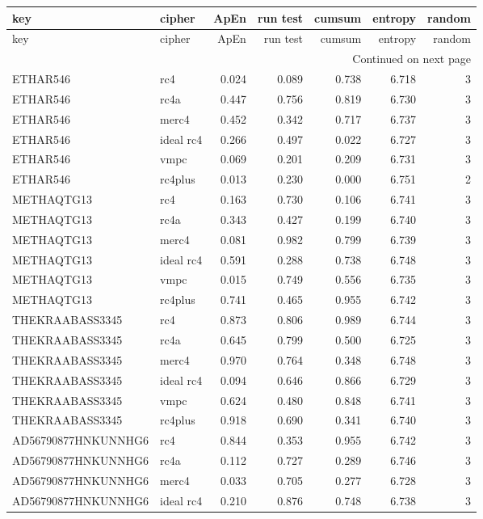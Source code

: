 \begin{longtable}{llrrrrr}
\toprule
key & cipher & ApEn & run test & cumsum & entropy & random \\
\midrule
\endfirsthead
\toprule
key & cipher & ApEn & run test & cumsum & entropy & random \\
\midrule
\endhead
\midrule
\multicolumn{7}{r}{Continued on next page} \\
\midrule
\endfoot
\bottomrule
\endlastfoot
ETHAR546 & rc4 & 0.024 & 0.089 & 0.738 & 6.718 & 3 \\
ETHAR546 & rc4a & 0.447 & 0.756 & 0.819 & 6.730 & 3 \\
ETHAR546 & merc4 & 0.452 & 0.342 & 0.717 & 6.737 & 3 \\
ETHAR546 & ideal rc4 & 0.266 & 0.497 & 0.022 & 6.727 & 3 \\
ETHAR546 & vmpc & 0.069 & 0.201 & 0.209 & 6.731 & 3 \\
ETHAR546 & rc4plus & 0.013 & 0.230 & 0.000 & 6.751 & 2 \\
METHAQTG13 & rc4 & 0.163 & 0.730 & 0.106 & 6.741 & 3 \\
METHAQTG13 & rc4a & 0.343 & 0.427 & 0.199 & 6.740 & 3 \\
METHAQTG13 & merc4 & 0.081 & 0.982 & 0.799 & 6.739 & 3 \\
METHAQTG13 & ideal rc4 & 0.591 & 0.288 & 0.738 & 6.748 & 3 \\
METHAQTG13 & vmpc & 0.015 & 0.749 & 0.556 & 6.735 & 3 \\
METHAQTG13 & rc4plus & 0.741 & 0.465 & 0.955 & 6.742 & 3 \\
THEKRAABASS3345 & rc4 & 0.873 & 0.806 & 0.989 & 6.744 & 3 \\
THEKRAABASS3345 & rc4a & 0.645 & 0.799 & 0.500 & 6.725 & 3 \\
THEKRAABASS3345 & merc4 & 0.970 & 0.764 & 0.348 & 6.748 & 3 \\
THEKRAABASS3345 & ideal rc4 & 0.094 & 0.646 & 0.866 & 6.729 & 3 \\
THEKRAABASS3345 & vmpc & 0.624 & 0.480 & 0.848 & 6.741 & 3 \\
THEKRAABASS3345 & rc4plus & 0.918 & 0.690 & 0.341 & 6.740 & 3 \\
AD56790877HNKUNNHG6 & rc4 & 0.844 & 0.353 & 0.955 & 6.742 & 3 \\
AD56790877HNKUNNHG6 & rc4a & 0.112 & 0.727 & 0.289 & 6.746 & 3 \\
AD56790877HNKUNNHG6 & merc4 & 0.033 & 0.705 & 0.277 & 6.728 & 3 \\
AD56790877HNKUNNHG6 & ideal rc4 & 0.210 & 0.876 & 0.748 & 6.738 & 3 \\

\end{longtable}
